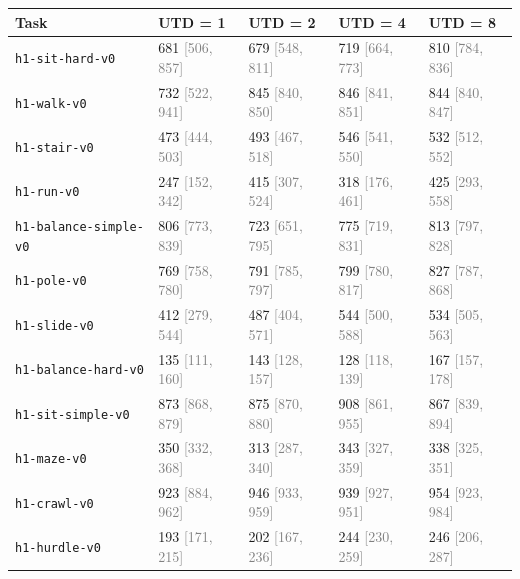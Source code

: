 \begin{tabular}{lllll}
\toprule
\textbf{Task} & \textbf{UTD = 1} & \textbf{UTD = 2} & \textbf{UTD = 4} & \textbf{UTD = 8} \\
\midrule
\texttt{h1-sit-hard-v0} & 681 \textcolor{gray}{[506, 857]} & 679 \textcolor{gray}{[548, 811]} & 719 \textcolor{gray}{[664, 773]} & 810 \textcolor{gray}{[784, 836]} \\
\texttt{h1-walk-v0} & 732 \textcolor{gray}{[522, 941]} & 845 \textcolor{gray}{[840, 850]} & 846 \textcolor{gray}{[841, 851]} & 844 \textcolor{gray}{[840, 847]} \\
\texttt{h1-stair-v0} & 473 \textcolor{gray}{[444, 503]} & 493 \textcolor{gray}{[467, 518]} & 546 \textcolor{gray}{[541, 550]} & 532 \textcolor{gray}{[512, 552]} \\
\texttt{h1-run-v0} & 247 \textcolor{gray}{[152, 342]} & 415 \textcolor{gray}{[307, 524]} & 318 \textcolor{gray}{[176, 461]} & 425 \textcolor{gray}{[293, 558]} \\
\texttt{h1-balance-simple-v0} & 806 \textcolor{gray}{[773, 839]} & 723 \textcolor{gray}{[651, 795]} & 775 \textcolor{gray}{[719, 831]} & 813 \textcolor{gray}{[797, 828]} \\
\texttt{h1-pole-v0} & 769 \textcolor{gray}{[758, 780]} & 791 \textcolor{gray}{[785, 797]} & 799 \textcolor{gray}{[780, 817]} & 827 \textcolor{gray}{[787, 868]} \\
\texttt{h1-slide-v0} & 412 \textcolor{gray}{[279, 544]} & 487 \textcolor{gray}{[404, 571]} & 544 \textcolor{gray}{[500, 588]} & 534 \textcolor{gray}{[505, 563]} \\
\texttt{h1-balance-hard-v0} & 135 \textcolor{gray}{[111, 160]} & 143 \textcolor{gray}{[128, 157]} & 128 \textcolor{gray}{[118, 139]} & 167 \textcolor{gray}{[157, 178]} \\
\texttt{h1-sit-simple-v0} & 873 \textcolor{gray}{[868, 879]} & 875 \textcolor{gray}{[870, 880]} & 908 \textcolor{gray}{[861, 955]} & 867 \textcolor{gray}{[839, 894]} \\
\texttt{h1-maze-v0} & 350 \textcolor{gray}{[332, 368]} & 313 \textcolor{gray}{[287, 340]} & 343 \textcolor{gray}{[327, 359]} & 338 \textcolor{gray}{[325, 351]} \\
\texttt{h1-crawl-v0} & 923 \textcolor{gray}{[884, 962]} & 946 \textcolor{gray}{[933, 959]} & 939 \textcolor{gray}{[927, 951]} & 954 \textcolor{gray}{[923, 984]} \\
\texttt{h1-hurdle-v0} & 193 \textcolor{gray}{[171, 215]} & 202 \textcolor{gray}{[167, 236]} & 244 \textcolor{gray}{[230, 259]} & 246 \textcolor{gray}{[206, 287]} \\

\end{tabular}
